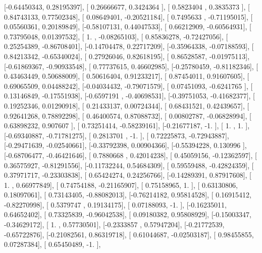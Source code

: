 \documentclass{article}
\begin{document}
       [-0.64450343,  0.28195397],
       [ 0.26666677,  0.3424364 ],
       [ 0.5823404 ,  0.3835373 ],
       [ 0.84743133,  0.77502348],
       [ 0.08649401, -0.20521184],
       [ 0.7495633 , -0.71195015],
       [ 0.05560361,  0.20189849],
       [-0.58107131,  0.44047533],
       [ 0.66212909, -0.60564931],
       [ 0.73795048,  0.01397532],
       [ 1.        , -0.08265103],
       [ 0.85836278, -0.72427056],
       [ 0.25254389, -0.86708401],
       [-0.14704478,  0.22717209],
       [-0.35964338, -0.07188593],
       [ 0.84213342, -0.65340024],
       [ 0.27926046,  0.82618195],
       [ 0.86528587, -0.01975113],
       [-0.61869367, -0.90933548],
       [ 0.77737615,  0.46602985],
       [-0.25780459, -0.81182346],
       [ 0.43463449,  0.50688009],
       [ 0.50616404,  0.91233217],
       [ 0.87454011,  0.91607605],
       [ 0.69065509,  0.04488242],
       [-0.04034432, -0.79071579],
       [ 0.07451093, -0.6241765 ],
       [ 0.13146849, -0.17551938],
       [-0.6597191 , -0.40698531],
       [-0.39751053, -0.41682377],
       [ 0.19252346,  0.01290918],
       [ 0.21433137,  0.00724344],
       [ 0.68431521,  0.42439657],
       [ 0.92641268,  0.78892298],
       [ 0.46400574,  0.87088732],
       [ 0.00802787, -0.06828994],
       [ 0.63898232,  0.907607  ],
       [ 0.73251414, -0.58239161],
       [-0.21677187, -1.        ],
       [ 1.        ,  1.        ],
       [-0.69340887, -0.71781275],
       [ 0.2813701 , -1.        ],
       [ 0.72225873, -0.72943887],
       [-0.29471639, -0.02540661],
       [-0.33792398,  0.00904366],
       [-0.55394228,  0.130996  ],
       [-0.68706477, -0.46421646],
       [ 0.7880668 ,  0.42014238],
       [ 0.45059156, -0.12362597],
       [ 0.36575927, -0.81291556],
       [-0.11732244,  0.54684309],
       [ 0.59559488, -0.42824359],
       [ 0.37971717, -0.23303838],
       [ 0.65424274,  0.24256766],
       [-0.14289391,  0.87917608],
       [ 1.        ,  0.66977849],
       [ 0.74754188, -0.21165907],
       [ 0.75158965,  1.        ],
       [ 0.63130806,  0.18097061],
       [ 0.73143405, -0.88082013],
       [-0.76214182,  0.95814528],
       [ 0.16915412, -0.82270998],
       [ 0.5379747 ,  0.19134175],
       [ 0.07188093, -1.        ],
       [-0.16235011,  0.64652402],
       [ 0.73325839, -0.96042538],
       [ 0.09180382,  0.95808929],
       [-0.15003347, -0.34629172],
       [ 1.        ,  0.57730501],
       [-0.2333857 ,  0.57947204],
       [-0.21772539, -0.65722876],
       [-0.21082561,  0.86319718],
       [ 0.61044687, -0.02503187],
       [ 0.98455855,  0.07287384],
       [ 0.65450489, -1.        ],
\end{document}

